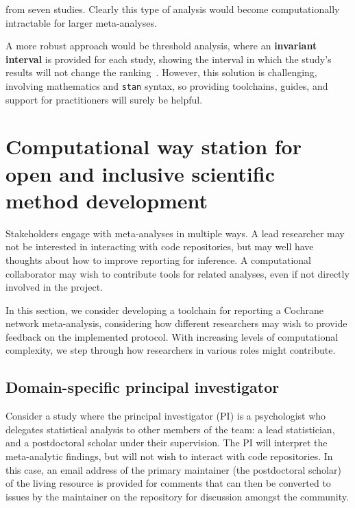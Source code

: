 \documentclass[12pt]{article}\usepackage[]{graphicx}\usepackage[]{color}
\newcommand{\code}[1]{\texttt{{#1}}}
\begin{document}
from seven studies. Clearly this type of analysis would become computationally intractable for larger meta-analyses.

A more robust approach would be threshold analysis, where an \textbf{invariant interval} is provided for each study, showing the interval in which the study's results will not change the ranking~\cite{phillippo_sensitivity_2018}. However, this solution is challenging, involving mathematics and \code{stan} syntax, so providing toolchains, guides, and support for practitioners will surely be helpful.

\section{Computational way station for open and inclusive scientific method development}\label{sec:comp}



Stakeholders engage with meta-analyses in multiple ways. A lead researcher may not be interested in interacting with code repositories, but may well have thoughts about how to improve reporting for inference. A computational collaborator may wish to contribute tools for related analyses, even if not directly involved in the project.

In this section, we consider developing a toolchain for reporting a Cochrane network meta-analysis, considering how different researchers may wish to provide feedback on the implemented protocol. With increasing levels of computational complexity, we step through how researchers in various roles might contribute.

\subsection{Domain-specific principal investigator}

Consider a study where the principal investigator (PI) is a psychologist who delegates statistical analysis to other members of the team: a lead statistician, and a postdoctoral scholar under their supervision. The PI will interpret the meta-analytic findings, but will not wish to interact with code repositories. In this case, an email address of the primary maintainer (the postdoctoral scholar) of the living resource is provided for comments that can then be converted to issues by the maintainer on the repository for discussion amongst the community.
\end{document}
